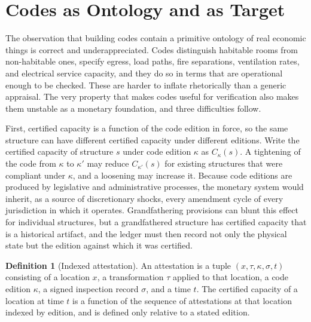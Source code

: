 \documentclass[11pt]{article}
\theoremstyle{definition}
\newtheorem{definition}{Definition}
\begin{document}
\section{Codes as Ontology and as Target}

The observation that building codes contain a primitive ontology of real economic things is correct and underappreciated. Codes distinguish habitable rooms from non-habitable ones, specify egress, load paths, fire separations, ventilation rates, and electrical service capacity, and they do so in terms that are operational enough to be checked. These are harder to inflate rhetorically than a generic appraisal. The very property that makes codes useful for verification also makes them unstable as a monetary foundation, and three difficulties follow.

First, certified capacity is a function of the code edition in force, so the same structure can have different certified capacity under different editions. Write the certified capacity of structure $s$ under code edition $\kappa$ as $C_\kappa(s)$. A tightening of the code from $\kappa$ to $\kappa'$ may reduce $C_{\kappa'}(s)$ for existing structures that were compliant under $\kappa$, and a loosening may increase it. Because code editions are produced by legislative and administrative processes, the monetary system would inherit, as a source of discretionary shocks, every amendment cycle of every jurisdiction in which it operates. Grandfathering provisions can blunt this effect for individual structures, but a grandfathered structure has certified capacity that is a historical artifact, and the ledger must then record not only the physical state but the edition against which it was certified.

\begin{definition}[Indexed attestation]
An attestation is a tuple $(x, \tau, \kappa, \sigma, t)$ consisting of a location $x$, a transformation $\tau$ applied to that location, a code edition $\kappa$, a signed inspection record $\sigma$, and a time $t$. The certified capacity of a location at time $t$ is a function of the sequence of attestations at that location indexed by edition, and is defined only relative to a stated edition.
\end{definition}
\end{document}
